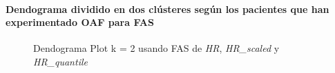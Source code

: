 \paragraph{Dendograma dividido en dos clústeres según los pacientes que han experimentado OAF para FAS}

\begin{figure}[H]
    \centering
    \caption{Dendograma Plot k = 2 usando FAS de \textit{HR}, \textit{HR\_scaled} y \textit{HR\_quantile}}\label{fig:acf_ctg_fc}
\end{figure}


